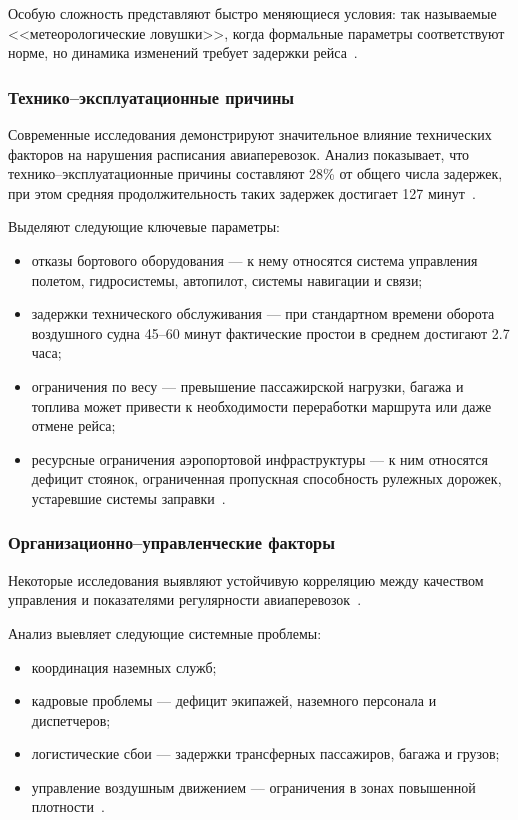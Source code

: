 Особую сложность представляют быстро меняющиеся условия: так называемые <<метеорологические ловушки>>, когда формальные параметры соответствуют норме, но динамика изменений требует задержки рейса~\cite{nasa-weather}.

\subsubsection*{Технико--эксплуатационные причины}
Современные исследования демонстрируют значительное влияние технических факторов на нарушения расписания авиаперевозок.
Анализ показывает, что технико--эксплуатационные причины составляют 28\% от общего числа задержек, при этом средняя продолжительность таких задержек достигает 127 минут~\cite{faa-ntsb}.

Выделяют следующие ключевые параметры:
\begin{itemize}[label=---]
    \item отказы бортового оборудования --- к нему относятся система управления полетом, гидросистемы, автопилот, системы навигации и связи;
    \item задержки технического обслуживания --- при стандартном времени оборота воздушного судна 45--60 минут фактические простои в среднем достигают 2.7 часа;
    \item ограничения по весу --- превышение пассажирской нагрузки, багажа и топлива может привести к необходимости переработки маршрута или даже отмене рейса;
    \item ресурсные ограничения аэропортовой инфраструктуры --- к ним относятся дефицит стоянок, ограниченная пропускная способность рулежных дорожек, устаревшие системы заправки~\cite{faa-maint}.
\end{itemize}

\subsubsection*{Организационно--управленческие факторы}
Некоторые исследования выявляют устойчивую корреляцию между качеством управления и показателями регулярности авиаперевозок~\cite{iata-ground-ops}.

Анализ выевляет следующие системные проблемы:
\begin{itemize}[label=---]
    \item координация наземных служб;
    \item кадровые проблемы --- дефицит экипажей, наземного персонала и диспетчеров;
    \item логистические сбои --- задержки трансферных пассажиров, багажа и грузов;
    \item управление воздушным движением --- ограничения в зонах повышенной плотности~\cite{faa-far117}.
\end{itemize}

